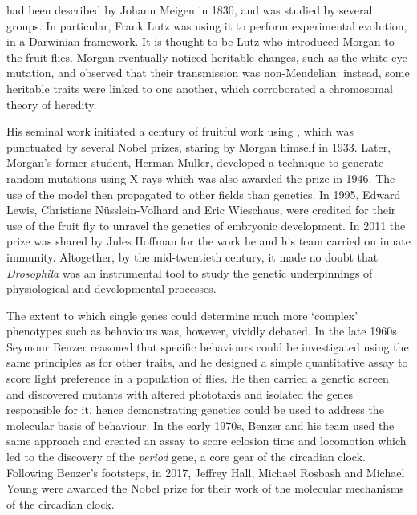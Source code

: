 \dmel{} had been described by Johann Meigen in 1830, and was studied by several groups.
In particular, Frank Lutz was using it to perform experimental evolution, in a Darwinian framework.
It is thought to be Lutz who introduced Morgan to the fruit flies.
Morgan eventually noticed heritable changes, such as the white eye mutation, and observed that their transmission was non-Mendelian: instead, some heritable traits were linked to one another, which corroborated a chromosomal theory of heredity\cite{carlson_how_2013}.


His seminal work initiated a century of fruitful work using \droso, which was punctuated by several Nobel prizes, staring by Morgan himself in 1933.
Later, Morgan's former student, Herman Muller, developed a technique to generate random mutations using X-rays which was also awarded the prize in 1946.
The use of the \droso{} model then propagated to other fields than genetics.
In 1995, Edward Lewis, Christiane Nüsslein-Volhard and Eric Wieschaus, were credited for their use of the fruit fly to unravel the genetics of embryonic development\cite{nusslein-volhard_determination_1987}.
In 2011 the prize was shared by Jules Hoffman for the work he and his team carried on innate immunity\cite{lemaitre_dorsoventral_1996, oneill_history_2013}.
Altogether, by the mid-twentieth century, it made no doubt that \emph{Drosophila} was an instrumental tool to study the genetic underpinnings of physiological and developmental processes.

The extent to which single genes could determine much more `complex' phenotypes such as behaviours was, however, vividly debated\cite{sokolowski_drosophila_2001,tully_discovery_1996}.
In the late 1960s Seymour Benzer reasoned that specific behaviours could be investigated using the same principles as for other traits, and he designed a simple quantitative assay to score light preference in a population of flies.
He then carried a genetic screen and discovered mutants with altered phototaxis and isolated the genes responsible for it\cite{benzer_behavioral_1967}, hence demonstrating genetics could be used to address the molecular basis of behaviour\cite{benzer_genetic_1973,bellen_100_2010}.
In the early 1970s, Benzer and his team used the same approach and created an assay to score eclosion time and locomotion which led to the discovery of the \emph{period} gene, a core gear of the circadian clock.
Following Benzer's footsteps, in 2017, Jeffrey Hall, Michael Rosbash and Michael Young were awarded the Nobel prize for their work of the molecular mechanisms of the circadian clock\cite{konopka_clock_1971,reddy_molecular_1984,bargiello_restoration_1984,zehring_p-element_1984,bargiello_molecular_1984}.


